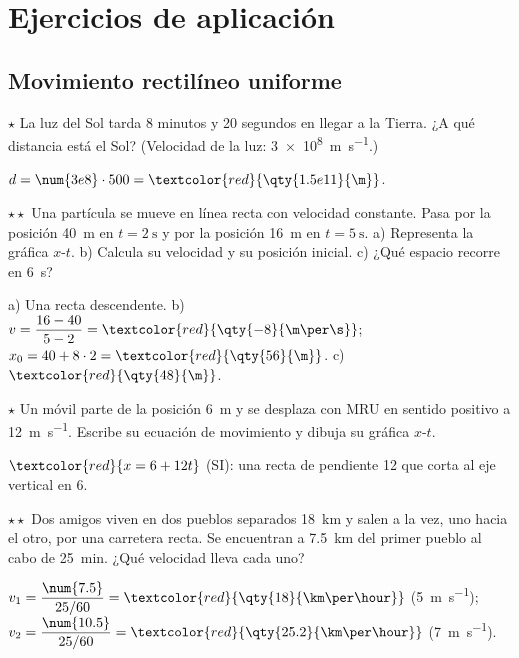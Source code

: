 \section{Ejercicios de aplicación}\label{sec:ud9-aplicacion}

\subsection{Movimiento rectilíneo uniforme}

\begin{exercise}
    \(\star\) La luz del Sol tarda 8 minutos y 20 segundos en llegar a la Tierra. ¿A qué distancia está el Sol? (Velocidad de la luz:
    \qty{3e8}{\m\per\s}.)
    \begin{solu}
        \(d = \num{3e8} \cdot 500 = \textcolor{red}{\qty{1.5e11}{\m}}\).
    \end{solu}
\end{exercise}

\begin{exercise}
    \(\star\star\) Una partícula se mueve en línea recta con velocidad constante. Pasa por la posición \qty{40}{\m} en
    \(t = \qty{2}{\s}\) y por la posición \qty{16}{\m} en \(t = \qty{5}{\s}\). a) Representa la gráfica \(x\)-\(t\). b) Calcula su
    velocidad y su posición inicial. c) ¿Qué espacio recorre en \qty{6}{\s}?
    \begin{solu}
        a) Una recta descendente. b) \(v = \dfrac{16 - 40}{5 - 2} = \textcolor{red}{\qty{-8}{\m\per\s}}\);
        \(x_0 = 40 + 8 \cdot 2 = \textcolor{red}{\qty{56}{\m}}\). c) \(\textcolor{red}{\qty{48}{\m}}\).
    \end{solu}
\end{exercise}

\begin{exercise}
    \(\star\) Un móvil parte de la posición \qty{6}{\m} y se desplaza con MRU en sentido positivo a \qty{12}{\m\per\s}. Escribe su
    ecuación de movimiento y dibuja su gráfica \(x\)-\(t\).
    \begin{solu}
        \(\textcolor{red}{x = 6 + 12t}\) (SI): una recta de pendiente 12 que corta al eje vertical en 6.
    \end{solu}
\end{exercise}

\begin{exercise}
    \(\star\star\) Dos amigos viven en dos pueblos separados \qty{18}{\km} y salen a la vez, uno hacia el otro, por una carretera
    recta. Se encuentran a \qty{7.5}{\km} del primer pueblo al cabo de \qty{25}{\minute}. ¿Qué velocidad lleva cada uno?
    \begin{solu}
        \(v_1 = \dfrac{\num{7.5}}{25/60} = \textcolor{red}{\qty{18}{\km\per\hour}}\) (\qty{5}{\m\per\s}); \(v_2 = \dfrac{\num{10.5}}{25/60} =
        \textcolor{red}{\qty{25.2}{\km\per\hour}}\) (\qty{7}{\m\per\s}).
    \end{solu}
\end{exercise}

